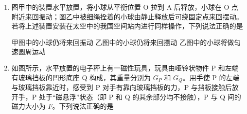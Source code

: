 \documentclass[\gkver]{gaokaozhenti}
\begin{document}
\begin{enumerate}
{	$f=\mu N$

	$T\sin\theta+N=mg$

	联立解得 $T=\frac{\mu mg}{\cos\theta+\mu\sin\theta}$，故 A 错误，B 正确；

	C．拉力的大小为

	$T=\frac{\mu mg}{\cos\theta+\mu\sin\theta}=\frac{\mu mg}{\sqrt{1+\mu^{2}}\sin(\theta+\varphi)}$

	其中 $\tan\varphi=\frac{1}{\mu}$，可知当 $\theta+\varphi=90^{\circ}$ 时，拉力有最小值，即减小夹角 $\theta$，轻绳的合拉力不一定减小，故 C 错误；

	D．摩擦力大小为

	$f=T\cos\theta=\frac{\mu mg\cos\theta}{\cos\theta+\mu\sin\theta}=\frac{\mu mg}{1+\mu\tan\theta}$

	可知增大夹角 $\theta$，摩擦力一直减小，当 $\theta$ 趋近于 $90^{\circ}$ 时，摩擦力最小，故轻绳的合拉力最小时，地面对石墩的摩擦力不是最小，故 D 错误；

	故选 B。
}

\item
图甲中的装置水平放置，将小球从平衡位置 O 拉到 A 后释放，小球在 O 点附近来回振动；图乙中被细绳拴着的小球由静止释放后可绕固定点来回摆动。若将上述装置安装在太空中的我国空间站内进行同样操作，下列说法正确的是 


{甲图中的小球仍将来回振动}
{乙图中的小球仍将来回摆动}
{乙图中的小球将做匀速圆周运动}


\item
如图所示，水平放置的电子秤上有一磁性玩具，玩具由哑铃状物件 P 和左端有玻璃挡板的凹形底座 Q 构成，其重量分别为 $G_{P}$ 和 $G_{Q}$。用手使 P 的左端与玻璃挡板靠近时，感受到 P 对手有靠向玻璃挡板的力，P 与挡板接触后放开手，P 处于“磁悬浮”状态（即 P 和 Q 的其余部分均不接触），P 与 Q 间的磁力大小为 $F$。下列说法正确的是 


\end{enumerate}
\end{document}
